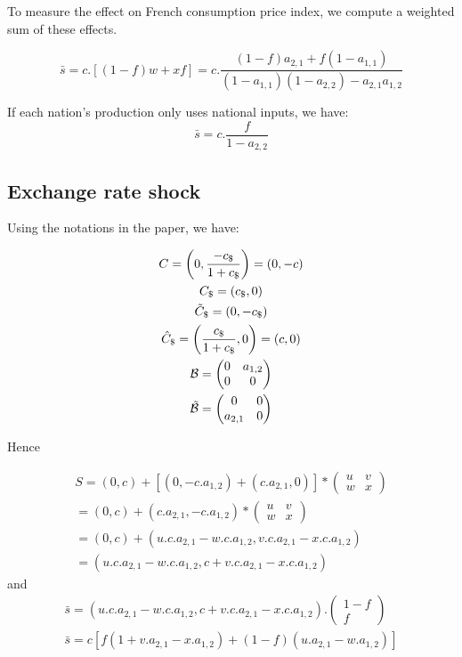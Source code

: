 \documentclass[11pt,a4paper]{article}
\begin{document}
To measure the effect on French consumption price index, we compute a weighted sum of these effects.

\begin{equation}
\bar{s}=c.\left[\left(1-f\right)w+xf\right]=c.\frac{\left(1-f\right)a_{2,1}+f\left(1-a_{1,1}\right)}{\left(1-a_{1,1}\right)\left(1-a_{2,2}\right)-a_{2,1}a_{1,2}}
\end{equation}

If each nation's production only uses national inputs, we have:
\begin{equation*}
\bar{s}=c.\frac{f}{1-a_{2,2}}
\end{equation*}

\subsection{Exchange rate shock}

Using the notations in the paper, we have:

\begin{gather*}
C=\left(0,\frac{-c_\$}{1+c_\$}\right)=\left(0,-c\right)
\\
C_\$=\left(c_\$,0\right)
\\
\tilde{C}_\$=\left(0,-c_\$\right)
\\
\hat{C}_\$=\left(\frac{c_\$}{1+c_\$},0\right)=\left(c,0\right)
\\
\cal B = \left(\begin{matrix}0&a_{1,2}\\0&0\end{matrix}\right)
\\
\tilde{\cal B} = \left(\begin{matrix}0&0\\a_{2,1}&0\end{matrix}\right)
\end{gather*}

Hence

\begin{gather*}
S =\left(0,c\right)+\left[\left(0,-c.a_{1,2}\right)+\left(c.a_{2,1},0\right)\right]*\left(\begin{matrix}u&v\\w&x\end{matrix}\right)
\\
=\left(0,c\right)+\left(c.a_{2,1},-c.a_{1,2}\right)*\left(\begin{matrix}u&v\\w&x\end{matrix}\right)
\\
=\left(0,c\right)+\left(u.c.a_{2,1}-w.c.a_{1,2},v.c.a_{2,1}-x.c.a_{1,2}\right)
\\
=\left(u.c.a_{2,1}-w.c.a_{1,2},c+v.c.a_{2,1}-x.c.a_{1,2}\right)
\end{gather*}
and
\begin{gather*}
\bar{s}=\left(u.c.a_{2,1}-w.c.a_{1,2},c+v.c.a_{2,1}-x.c.a_{1,2}\right).\left(\begin{matrix}1-f\\f\end{matrix}\right)
\\
\bar{s}=c\left[f\left(1+v.a_{2,1}-x.a_{1,2}\right)+\left(1-f\right)\left(u.a_{2,1}-w.a_{1,2}\right)\right]
\end{gather*}
\end{document}
